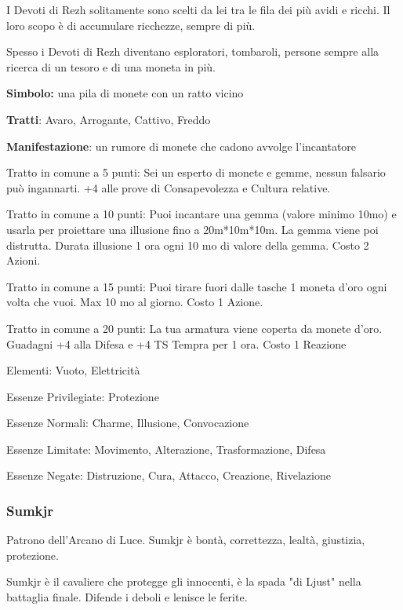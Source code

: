 \documentclass[a4paper,11pt,twoside,openany]{book}
\begin{document}
I Devoti di Rezh solitamente sono scelti da lei tra le fila dei più avidi e ricchi. Il loro scopo è di accumulare ricchezze, sempre di più.

Spesso i Devoti di Rezh diventano esploratori, tombaroli, persone sempre alla ricerca di un tesoro e di una moneta in più.

\textbf{Simbolo:} una pila di monete con un ratto vicino

\textbf{Tratti}: Avaro, Arrogante, Cattivo, Freddo

\textbf{Manifestazione}: un rumore di monete che cadono avvolge l'incantatore

\bigskip

Tratto in comune a 5 punti: Sei un esperto di monete e gemme, nessun falsario può ingannarti. +4 alle prove di Consapevolezza e Cultura relative.

Tratto in comune a 10 punti: Puoi incantare una gemma (valore minimo 10mo) e usarla per proiettare una illusione fino a 20m{*}10m{*}10m. La gemma viene poi distrutta. Durata illusione 1 ora ogni 10 mo di valore della gemma. Costo 2 Azioni.

Tratto in comune a 15 punti: Puoi tirare fuori dalle tasche 1 moneta d'oro ogni volta che vuoi. Max 10 mo al giorno. Costo 1 Azione.

Tratto in comune a 20 punti: La tua armatura viene coperta da monete d'oro. Guadagni +4 alla Difesa e +4 TS Tempra per 1 ora. Costo 1 Reazione

\bigskip

Elementi: Vuoto, Elettricità

\bigskip

Essenze Privilegiate: Protezione

Essenze Normali: Charme, Illusione, Convocazione

Essenze Limitate: Movimento, Alterazione, Trasformazione, Difesa

Essenze Negate: Distruzione, Cura, Attacco, Creazione, Rivelazione

\subsubsection{Sumkjr}

\label{sumkjr}

Patrono dell'Arcano di Luce. Sumkjr è bontà, correttezza, lealtà, giustizia, protezione.

Sumkjr è il cavaliere che protegge gli innocenti, è la spada "di Ljust" nella battaglia finale. Difende i deboli e lenisce le ferite.
\end{document}
